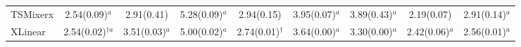 \begin{table}[!t]
\begin{adjustbox}{max width=\linewidth}
\begin{tabular}{lcccccccc}
TSMixerx & 2.54{\scriptsize\color{gray}(0.09)}$^{a}$ & 2.91{\scriptsize\color{gray}(0.41)} & 5.28{\scriptsize\color{gray}(0.09)}$^{a}$ & 2.94{\scriptsize\color{gray}(0.15)} & 3.95{\scriptsize\color{gray}(0.07)}$^{a}$ & 3.89{\scriptsize\color{gray}(0.43)}$^{a}$ & 2.19{\scriptsize\color{gray}(0.07)} & 2.91{\scriptsize\color{gray}(0.14)}$^{a}$ \\
XLinear & 2.54{\scriptsize\color{gray}(0.02)}$^{\dagger{}a}$ & 3.51{\scriptsize\color{gray}(0.03)}$^{a}$ & 5.00{\scriptsize\color{gray}(0.02)}$^{a}$ & 2.74{\scriptsize\color{gray}(0.01)}$^{\dagger{}}$ & 3.64{\scriptsize\color{gray}(0.00)}$^{a}$ & 3.30{\scriptsize\color{gray}(0.00)}$^{a}$ & 2.42{\scriptsize\color{gray}(0.06)}$^{a}$ & 2.56{\scriptsize\color{gray}(0.01)}$^{a}$ \\
\bottomrule
\end{tabular}
\end{adjustbox}
\end{table}
